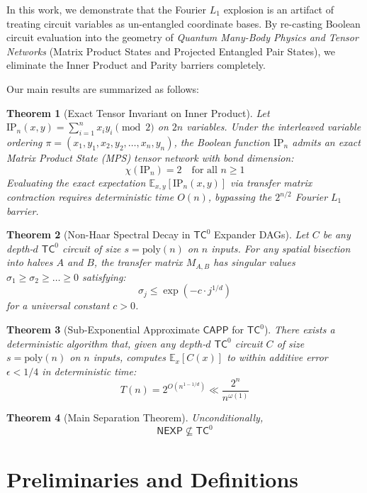 \documentclass[11pt,letterpaper]{article}
\newtheorem{theorem}{Theorem}[section]
\newcommand{\NEXP}{\mathsf{NEXP}}
\newcommand{\TC}{\mathsf{TC}}
\newcommand{\CAPP}{\mathsf{CAPP}}
\newcommand{\poly}{\mathrm{poly}}
\newcommand{\E}{\mathbb{E}}
\newcommand{\eps}{\epsilon}
\begin{document}
In this work, we demonstrate that the Fourier $L_1$ explosion is an artifact of treating circuit variables as un-entangled coordinate bases. By re-casting Boolean circuit evaluation into the geometry of \emph{Quantum Many-Body Physics and Tensor Networks} (Matrix Product States and Projected Entangled Pair States), we eliminate the Inner Product and Parity barriers completely.

Our main results are summarized as follows:
\begin{theorem}[Exact Tensor Invariant on Inner Product]
Let $\mathrm{IP}_n(x,y) = \sum_{i=1}^n x_i y_i \pmod 2$ on $2n$ variables. Under the interleaved variable ordering $\pi = (x_1, y_1, x_2, y_2, \dots, x_n, y_n)$, the Boolean function $\mathrm{IP}_n$ admits an exact Matrix Product State (MPS) tensor network with bond dimension:
\[
\chi(\mathrm{IP}_n) = 2 \quad \text{for all } n \ge 1
\]
Evaluating the exact expectation $\E_{x,y}[\mathrm{IP}_n(x,y)]$ via transfer matrix contraction requires deterministic time $O(n)$, bypassing the $2^{n/2}$ Fourier $L_1$ barrier.
\end{theorem}

\begin{theorem}[Non-Haar Spectral Decay in $\TC^0$ Expander DAGs]
Let $C$ be any depth-$d$ $\TC^0$ circuit of size $s = \poly(n)$ on $n$ inputs. For any spatial bisection into halves $A$ and $B$, the transfer matrix $M_{A,B}$ has singular values $\sigma_1 \ge \sigma_2 \ge \dots \ge 0$ satisfying:
\[
\sigma_j \le \exp\left(-c \cdot j^{1/d}\right)
\]
for a universal constant $c > 0$.
\end{theorem}

\begin{theorem}[Sub-Exponential Approximate $\CAPP$ for $\TC^0$]
There exists a deterministic algorithm that, given any depth-$d$ $\TC^0$ circuit $C$ of size $s = \poly(n)$ on $n$ inputs, computes $\E_{x}[C(x)]$ to within additive error $\eps < 1/4$ in deterministic time:
\[
T(n) = 2^{O(n^{1 - 1/d})} \ll \frac{2^n}{n^{\omega(1)}}
\]
\end{theorem}

\begin{theorem}[Main Separation Theorem]
Unconditionally,
\[
\NEXP \not\subseteq \TC^0
\]
\end{theorem}

\section{Preliminaries and Definitions}
\end{document}
